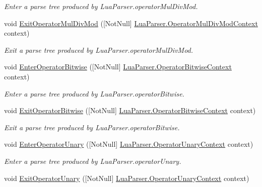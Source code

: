 \begin{DoxyCompactItemize}
\begin{DoxyCompactList}\small\item\em Enter a parse tree produced by Lua\+Parser.\+operator\+Mul\+Div\+Mod. \end{DoxyCompactList}\item 
void \mbox{\hyperlink{interfacezlua_1_1_i_lua_listener_a67436f1864c243aabc07a339c1c96085}{Exit\+Operator\+Mul\+Div\+Mod}} (\mbox{[}Not\+Null\mbox{]} \mbox{\hyperlink{classzlua_1_1_lua_parser_1_1_operator_mul_div_mod_context}{Lua\+Parser.\+Operator\+Mul\+Div\+Mod\+Context}} context)
\begin{DoxyCompactList}\small\item\em Exit a parse tree produced by Lua\+Parser.\+operator\+Mul\+Div\+Mod. \end{DoxyCompactList}\item 
void \mbox{\hyperlink{interfacezlua_1_1_i_lua_listener_a0117059ce449d21ba61dc80748edaa15}{Enter\+Operator\+Bitwise}} (\mbox{[}Not\+Null\mbox{]} \mbox{\hyperlink{classzlua_1_1_lua_parser_1_1_operator_bitwise_context}{Lua\+Parser.\+Operator\+Bitwise\+Context}} context)
\begin{DoxyCompactList}\small\item\em Enter a parse tree produced by Lua\+Parser.\+operator\+Bitwise. \end{DoxyCompactList}\item 
void \mbox{\hyperlink{interfacezlua_1_1_i_lua_listener_ab567120e6d7258b74d7f88c14d6cf3c3}{Exit\+Operator\+Bitwise}} (\mbox{[}Not\+Null\mbox{]} \mbox{\hyperlink{classzlua_1_1_lua_parser_1_1_operator_bitwise_context}{Lua\+Parser.\+Operator\+Bitwise\+Context}} context)
\begin{DoxyCompactList}\small\item\em Exit a parse tree produced by Lua\+Parser.\+operator\+Bitwise. \end{DoxyCompactList}\item 
void \mbox{\hyperlink{interfacezlua_1_1_i_lua_listener_a7b7f6eceb594a19cd7ee783bdb209c8e}{Enter\+Operator\+Unary}} (\mbox{[}Not\+Null\mbox{]} \mbox{\hyperlink{classzlua_1_1_lua_parser_1_1_operator_unary_context}{Lua\+Parser.\+Operator\+Unary\+Context}} context)
\begin{DoxyCompactList}\small\item\em Enter a parse tree produced by Lua\+Parser.\+operator\+Unary. \end{DoxyCompactList}\item 
void \mbox{\hyperlink{interfacezlua_1_1_i_lua_listener_ab4c9d1484b1f65d892ad588b7b01814e}{Exit\+Operator\+Unary}} (\mbox{[}Not\+Null\mbox{]} \mbox{\hyperlink{classzlua_1_1_lua_parser_1_1_operator_unary_context}{Lua\+Parser.\+Operator\+Unary\+Context}} context)

\end{DoxyCompactItemize}
